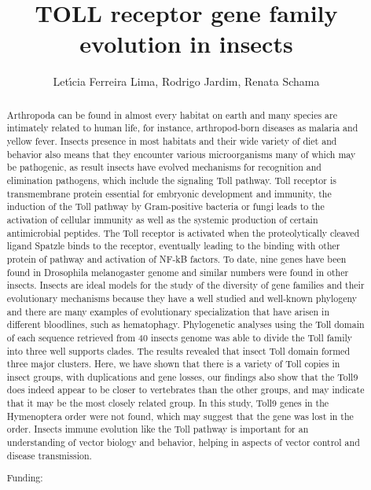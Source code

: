 \documentclass[twoside]{article}
\title{\vspace{-15mm}\fontsize{24pt}{10pt}\selectfont\textbf{ TOLL receptor gene family evolution in insects }} %
\author{ Let\'{\i}cia Ferreira Lima, Rodrigo Jardim, Renata Schama }
\affil{ Laborat\'orio de Biologia Computacional e Sistemas,  Oswaldo Cruz Institute- Fiocruz }
\date{}
\begin{document}
  
  
  \maketitle %
  
  
  \thispagestyle{fancy} %
  
  
  \begin{abstract}
  Arthropoda can be found in almost every habitat on earth and many species are intimately related to human life,  for instance,  arthropod-born diseases as malaria and yellow fever. Insects presence in most habitats and their wide variety of diet and behavior also means that they encounter various microorganisms many of which may be pathogenic,  as result insects have evolved mechanisms for recognition and elimination pathogens,  which include the signaling Toll pathway. Toll receptor is transmembrane protein essential for embryonic development and immunity,  the induction of the Toll pathway by Gram-positive bacteria or fungi leads to the activation of cellular immunity as well as the systemic production of certain antimicrobial peptides. The Toll receptor is activated when the proteolytically cleaved ligand Spatzle binds to the receptor,  eventually leading to the binding with other protein of pathway and activation of NF-kB factors. To date,  nine genes have been found in Drosophila melanogaster genome and similar numbers were found in other insects. Insects are ideal models for the study of the diversity of gene families and their evolutionary mechanisms because they have a well studied and well-known phylogeny and there are many examples of evolutionary specialization that have arisen in different bloodlines,  such as hematophagy.  Phylogenetic analyses using the Toll domain of each sequence retrieved from 40 insects genome was able to divide the Toll family into three well supports clades. The results revealed that insect Toll domain formed three major clusters. Here,  we have shown that there is a variety of Toll copies in insect groups,  with duplications and gene losses,  our findings also show that the Toll9 does indeed appear to be closer to vertebrates than the other groups,  and may indicate that it may be the most closely related group. In this study,  Toll9 genes in the Hymenoptera order were not found,  which may suggest that the gene was lost in the order. Insects immune evolution like the Toll pathway is important for an understanding of vector biology and behavior,  helping in aspects of vector control and disease transmission.
  
  Funding:  \\ 
  \end{abstract}
  
\end{document}

